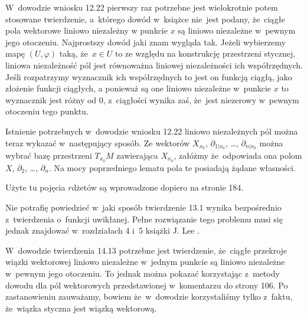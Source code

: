 \documentclass[a4paper,11pt]{article}
\begin{document}
\vspace{\spaceFour}


\start {} W~dowodzie wniosku 12.22 pierwszy raz potrzebne jest
wielokrotnie potem stosowane twierdzenie, a~którego dowód w~książce
nie~jest podany, że~ciągłe pola wektorowe liniowo niezależny w punkcie
$x$ są liniowo niezależne w~pewnym jego otoczeniu. Najprostszy dowód
jaki znam wygląda tak. Jeżeli wybierzemy mapę $( U, \varphi )$ taką,
że~$x \in U$ to ze względu na konstrukcję przestrzeni stycznej,
liniowa niezależność pól jest równoważna liniowej niezależności ich
współrzędnych. Jeśli rozpatrzymy wyznacznik ich współrzędnych to jest
on funkcją ciągłą, jako złożenie funkcji ciągłych, a ponieważ są one
liniowo niezależne w~punkcie $x$ to wyznacznik jest różny od 0,
z~ciągłości wynika zaś, że~jest niezerowy w~pewnym otoczeniu tego
punktu.

\vspace{\spaceFour}


\start {} Istnienie potrzebnych w~dowodzie wniosku 12.22
liniowo niezależnych pól można teraz wykazać w~następujący sposób. Ze
wektorów $X_{ x_{ 0 } }$, $\partial_{ 1 | { x_{ 0 } } }$, \ldots,
$\partial_{ n | { x_{ 0 } } }$ można wybrać bazę przestrzeni
$T_{ { x_{ 0 } } }M$ zawierająca $X_{ { x_{ 0 } } }$, załóżmy
że~odpowiada ona polom $X$, $\partial_{ 2 }$, \ldots,
$\partial_{ n }$. Na mocy poprzedniego lematu pola te posiadają żądane
własności.

\vspace{\spaceFour}


\start {} Użyte tu pojęcia $r$\dywiz dżetów są wprowadzone
dopiero na stronie 184.

\vspace{\spaceFour}


\start {} Nie potrafię powiedzieć w~jaki sposób twierdzenie
13.1 wynika bezpośrednio z~twierdzenia o~funkcji uwikłanej. Pełne
rozwiązanie tego problemu musi się jednak znajdować w~rozdziałach 4
i~5 książki J. Lee \cite{Lee13}.

\vspace{\spaceFour}


\start {} W~dowodzie twierdzenia 14.13 potrzebne jest
twierdzenie, że~ciągłe przekroje wiązki wektorowej liniowo niezależne
w~jednym punkcie są liniowo niezależne w~pewnym jego otoczeniu. To
jednak można pokazać korzystając z~metody dowodu dla pól wektorowych
przedstawionej w~komentarzu do strony 106. Po zastanowieniu zauważamy,
bowiem że~w~dowodzie korzystaliśmy tylko z~faktu, że~wiązka styczna
jest wiązką wektorową.
\end{document}
